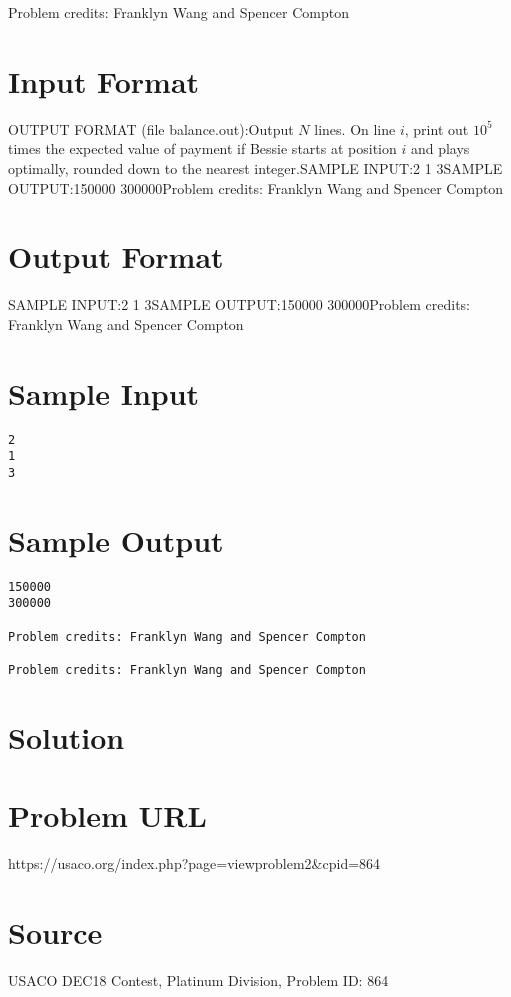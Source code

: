 \documentclass[12pt]{article}
\begin{document}
Problem credits: Franklyn Wang and Spencer Compton



\section*{Input Format}
OUTPUT FORMAT (file balance.out):Output $N$ lines.  On line $i$, print out $10^5$ times the expected value of
payment if Bessie starts at position $i$ and plays optimally, rounded down to
the nearest integer.SAMPLE INPUT:2
1
3SAMPLE OUTPUT:150000
300000Problem credits: Franklyn Wang and Spencer Compton

\section*{Output Format}
SAMPLE INPUT:2
1
3SAMPLE OUTPUT:150000
300000Problem credits: Franklyn Wang and Spencer Compton

\section*{Sample Input}
\begin{verbatim}
2
1
3
\end{verbatim}

\section*{Sample Output}
\begin{verbatim}
150000
300000

Problem credits: Franklyn Wang and Spencer Compton

Problem credits: Franklyn Wang and Spencer Compton
\end{verbatim}

\section*{Solution}


\section*{Problem URL}
https://usaco.org/index.php?page=viewproblem2&cpid=864

\section*{Source}
USACO DEC18 Contest, Platinum Division, Problem ID: 864
\end{document}
